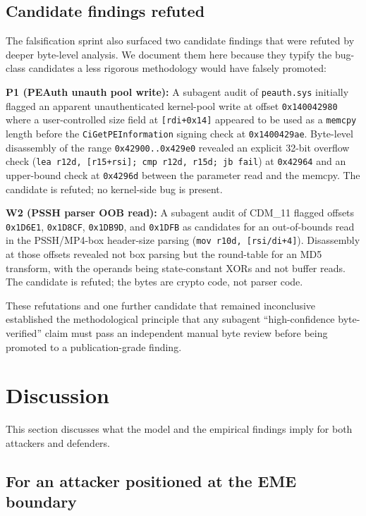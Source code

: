 \documentclass[11pt,letterpaper]{article}
\begin{document}
\subsection{Candidate findings refuted}
\label{sec:robustness-refuted}

The falsification sprint also surfaced two candidate findings that
were refuted by deeper byte-level analysis. We document them here
because they typify the bug-class candidates a less rigorous
methodology would have falsely promoted:

\textbf{P1 (PEAuth unauth pool write):} A subagent audit of
\texttt{peauth.sys} initially flagged an apparent unauthenticated
kernel-pool write at offset \texttt{0x140042980} where a
user-controlled size field at \texttt{[rdi+0x14]} appeared to be
used as a \texttt{memcpy} length before the
\texttt{CiGetPEInformation} signing check at
\texttt{0x1400429ae}. Byte-level disassembly of the range
\texttt{0x42900..0x429e0} revealed an explicit 32-bit overflow
check (\texttt{lea r12d, [r15+rsi]; cmp r12d, r15d; jb fail}) at
\texttt{0x42964} and an upper-bound check at \texttt{0x4296d}
between the parameter read and the memcpy. The candidate is
refuted; no kernel-side bug is present.

\textbf{W2 (PSSH parser OOB read):} A subagent audit of CDM\_11
flagged offsets \texttt{0x1D6E1}, \texttt{0x1D8CF},
\texttt{0x1DB9D}, and \texttt{0x1DFB} as candidates for an
out-of-bounds read in the PSSH/MP4-box header-size parsing
(\texttt{mov r10d, [r{si/di}+4]}). Disassembly at those offsets
revealed not box parsing but the round-table for an MD5 transform,
with the operands being state-constant XORs and not buffer reads.
The candidate is refuted; the bytes are crypto code, not parser
code.

These refutations and one further candidate that remained
inconclusive established the methodological principle that any
subagent ``high-confidence byte-verified'' claim must pass an
independent manual byte review before being promoted to a
publication-grade finding.

\section{Discussion}
\label{sec:discussion}

This section discusses what the model and the empirical findings
imply for both attackers and defenders.

\subsection{For an attacker positioned at the EME boundary}
\end{document}
